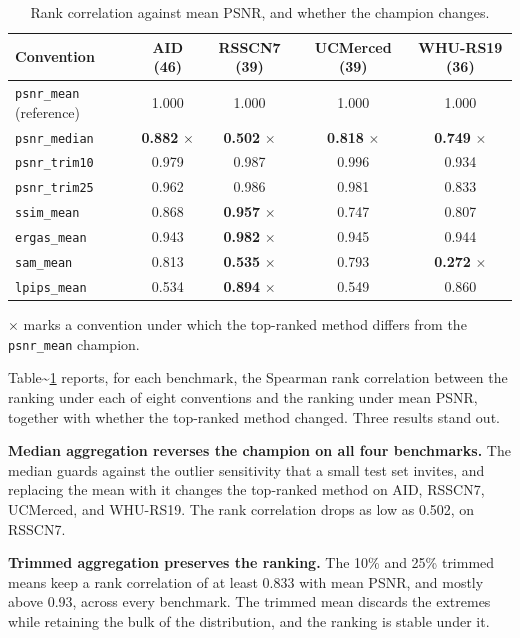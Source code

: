 \documentclass[pdflatex,sn-nature]{sn-jnl}
\newlength{\tblavail}
\begin{document}
\begin{table}[htbp]
\centering
\small
\setlength{\tabcolsep}{3pt}
\setlength{\tblavail}{\dimexpr\textwidth-10\tabcolsep\relax}
\begin{tabular}{lcccc}
\hline
Convention & AID (46) & RSSCN7 (39) & UCMerced (39) & WHU-RS19 (36) \\
\hline
\texttt{psnr\_\allowbreak mean} (reference) & 1.000 & 1.000 & 1.000 & 1.000 \\
\texttt{psnr\_\allowbreak median} & \textbf{0.882} $\times$ & \textbf{0.502} $\times$ & \textbf{0.818} $\times$ & \textbf{0.749} $\times$ \\
\texttt{psnr\_\allowbreak trim10} & 0.979 & 0.987 & 0.996 & 0.934 \\
\texttt{psnr\_\allowbreak trim25} & 0.962 & 0.986 & 0.981 & 0.833 \\
\texttt{ssim\_\allowbreak mean} & 0.868 & \textbf{0.957} $\times$ & 0.747 & 0.807 \\
\texttt{ergas\_\allowbreak mean} & 0.943 & \textbf{0.982} $\times$ & 0.945 & 0.944 \\
\texttt{sam\_\allowbreak mean} & 0.813 & \textbf{0.535} $\times$ & 0.793 & \textbf{0.272} $\times$ \\
\texttt{lpips\_\allowbreak mean} & 0.534 & \textbf{0.894} $\times$ & 0.549 & 0.860 \\
\hline
\end{tabular}
\caption{Rank correlation against mean PSNR, and whether the champion changes.}\label{tab:conventions}
\end{table}

$\times$ marks a convention under which the top-ranked method differs from the \texttt{psnr\_\allowbreak mean} champion.

Table\textasciitilde{}\ref{tab:conventions} reports, for each benchmark, the Spearman rank correlation between the ranking under each of eight conventions and the ranking under mean PSNR, together with whether the top-ranked method changed. Three results stand out.

\textbf{Median aggregation reverses the champion on all four benchmarks.} The median guards against the outlier sensitivity that a small test set invites, and replacing the mean with it changes the top-ranked method on AID, RSSCN7, UCMerced, and WHU-RS19. The rank correlation drops as low as 0.502, on RSSCN7.

\textbf{Trimmed aggregation preserves the ranking.} The 10\% and 25\% trimmed means keep a rank correlation of at least 0.833 with mean PSNR, and mostly above 0.93, across every benchmark. The trimmed mean discards the extremes while retaining the bulk of the distribution, and the ranking is stable under it.
\end{document}
